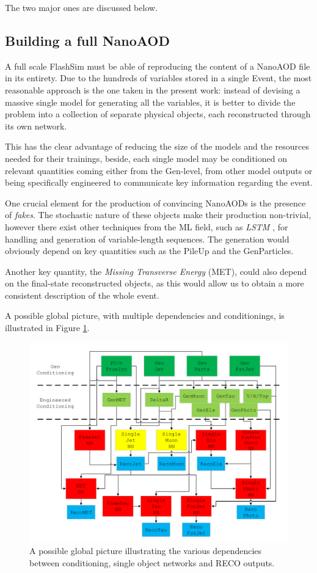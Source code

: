 The two major ones are discussed below.


\subsection{Building a full NanoAOD}
A full scale FlashSim must be able of reproducing the content of a NanoAOD file in its entirety. Due to the hundreds of variables stored in a single Event, the most reasonable approach is the one taken in the present work: instead of devising a massive single model for generating all the variables, it is better to divide the problem into a collection of separate physical objects, each reconstructed through its own network.

This has the clear advantage of reducing the size of the models and the resources needed for their trainings, beside, each single model may be conditioned on relevant quantities coming either from the Gen-level, from other model outputs or being specifically engineered to communicate key information regarding the event.

One crucial element for the production of convincing NanoAODs is the presence of \emph{fakes}. The stochastic nature of these objects make their production non-trivial, however there exist other techniques from the ML field, such as \emph{LSTM} \cite{lstm}, for handling and generation of variable-length sequences. The generation would obviously depend on key quantities such as the PileUp and the GenParticles.

Another key quantity, the \emph{Missing Transverse Energy} (MET), could also depend on the final-state reconstructed objects, as this would allow us to obtain a more consistent description of the whole event.

A possible global picture, with multiple dependencies and conditionings, is illustrated in Figure \ref{fig:globpic}.

\begin{figure}
    \centering
    \includegraphics[width=\linewidth]{gfx/ch7/fullnanoaod.pdf}
    \caption[A global picture]{A possible global picture illustrating the various dependencies between conditioning, single object networks and RECO outputs.}
    \label{fig:globpic}
\end{figure}

